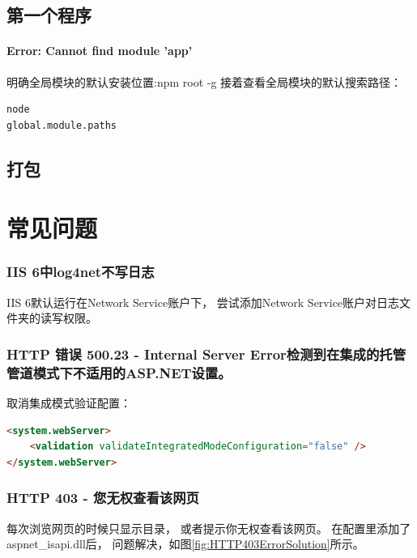 \documentclass{book}
\begin{document}
\subsection{第一个程序}

\paragraph{Error: Cannot find module 'app'}明确全局模块的默认安装位置:npm root -g
接着查看全局模块的默认搜索路径：

\begin{lstlisting}[language=Bash]
node
global.module.paths
\end{lstlisting}




\subsection{打包}




\section{常见问题}

\subsubsection{IIS 6中log4net不写日志}

IIS 6默认运行在Network Service账户下，
尝试添加Network Service账户对日志文件夹的读写权限。

\subsubsection{HTTP 错误 500.23 - Internal Server Error检测到在集成的托管管道模式下不适用的ASP.NET设置。}
取消集成模式验证配置：
\begin{lstlisting}[language=HTML]
<system.webServer>  
    <validation validateIntegratedModeConfiguration="false" />
</system.webServer>
\end{lstlisting}

\subsubsection{HTTP 403 - 您无权查看该网页}

每次浏览网页的时候只显示目录，
或者提示你无权查看该网页。
在配置里添加了aspnet\_isapi.dll后，
问题解决，如图\ref{fig:HTTP403ErrorSolution}所示。
\end{document}
